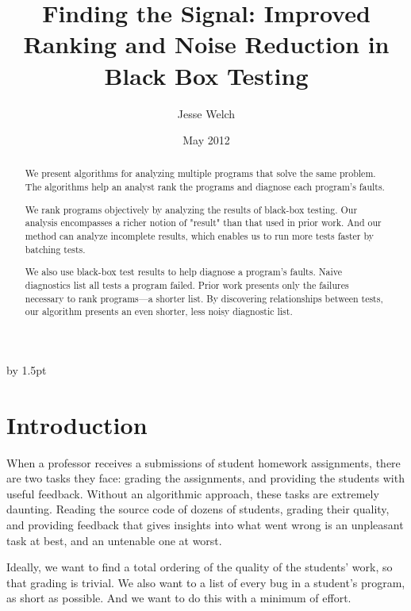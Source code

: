 \documentclass[11pt,twoside]{article}
\theoremstyle{definition}
\begin{document}
\advance\extrarowheight by 1.5pt

\title{Finding the Signal: Improved Ranking and Noise Reduction in Black Box Testing}
\author{Jesse Welch}
\date{May 2012}

\pagestyle{headings}


\maketitle

\begin{abstract}
We present algorithms for analyzing multiple programs that solve the
same problem.  The algorithms help an analyst rank the programs and
diagnose each program's faults.

We rank programs objectively by analyzing the results of black-box
testing.  Our analysis encompasses a richer notion of "result" than
that used in prior work.  And our method can analyze incomplete
results, which enables us to run more tests faster by batching tests.

We also use black-box test results to help diagnose a program's
faults.  Naive diagnostics list all tests a program failed.  Prior
work presents only the failures necessary to rank programs---a shorter
list.  By discovering relationships between tests, our algorithm
presents an even shorter, less noisy diagnostic list.
\end{abstract}

\newpage
\tableofcontents
\newpage

\baselineskip %


\section{Introduction}
When a professor receives a submissions of student homework assignments, there are two tasks they face: grading the assignments, and providing the students with useful feedback. Without an algorithmic approach, these tasks are extremely daunting. Reading the source code of dozens of students, grading their quality, and providing feedback that gives insights into what went wrong is an unpleasant task at best, and an untenable one at worst.

Ideally, we want to find a total ordering of the quality of the students' work, so that grading is trivial. We also want to a list of every bug in a student's program, as short as possible. And we want to do this with a minimum of effort.
\end{document}
